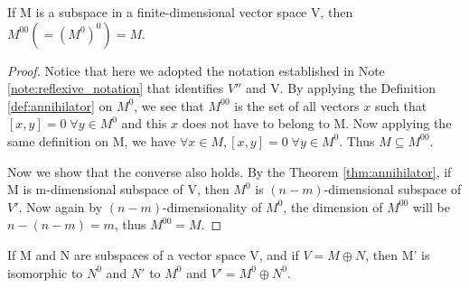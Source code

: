 \documentclass[11pt,a4paper]{article}
\begin{document}
\begin{corollary}\label{cor:annihilator}
    If M is a subspace in a finite-dimensional vector space V, then $M^{00}(=(M^0)^0)=M$.
\end{corollary}

\begin{proof}
    Notice that here we adopted the notation established in Note \ref{note:reflexive_notation} that identifies $V''$ and V. By applying the Definition \ref{def:annihilator} on $M^0$, we see that $M^{00}$ is the set of all vectors $x$ such that $[x,y]=0\;\forall y\in M^0$ and this $x$ does not have to belong to M. Now applying the same definition on M, we have $\forall x\in M, [x,y]=0\;\forall y\in M^0$. Thus $M\subseteq M^{00}$. 
    
    Now we show that the converse also holds. By the Theorem \ref{thm:annihilator}, if M is m-dimensional subspace of V, then $M^0$ is $(n-m)$-dimensional subspace of $V'$. Now again by $(n-m)$-dimensionality of $M^0$, the dimension of $M^{00}$ will be $n-(n-m)=m$, thus $M^{00}=M$.
\end{proof}

\begin{theorem}\label{thm:dual_direct_sum}
    If M and N are subspaces of a vector space V, and if $V=M\oplus N$, then M' is isomorphic to $N^0$ and $N'$ to $M^0$ and $V'=M^0\oplus N^0$.
\end{theorem}
\end{document}
